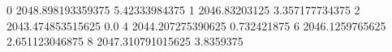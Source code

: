 0 2048.898193359375 5.42333984375
1 2046.83203125 3.357177734375
2 2043.474853515625 0.0
4 2044.207275390625 0.732421875
6 2046.1259765625 2.651123046875
8 2047.310791015625 3.8359375
